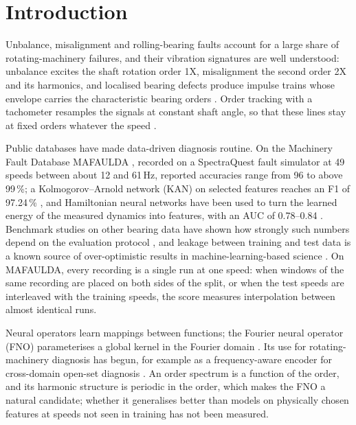 \documentclass[preprint,review,12pt,authoryear=false]{elsarticle}
\begin{document}
\section{Introduction}
\label{sec:intro}

Unbalance, misalignment and rolling-bearing faults account for a large share of rotating-machinery failures, and
their vibration signatures are well understood: unbalance excites the shaft rotation order 1X, misalignment the
second order 2X and its harmonics, and localised bearing defects produce impulse trains whose envelope carries the
characteristic bearing orders \citep{randall2011bearing}. Order tracking with a tachometer resamples the signals at
constant shaft angle, so that these lines stay at fixed orders whatever the speed \citep{fyfe1997cot}.

Public databases have made data-driven diagnosis routine. On the Machinery Fault Database MAFAULDA \citep{mafaulda},
recorded on a SpectraQuest fault simulator at 49 speeds between about 12 and 61\,Hz, reported accuracies range from
96 to above 99\,\%; a Kolmogorov--Arnold network (KAN) on selected features reaches an F1 of 97.24\,\%
\citep{rigas2024kan}, and Hamiltonian neural networks have been used to turn the learned energy of the measured
dynamics into features, with an AUC of 0.78--0.84 \citep{shen2023hnn}. Benchmark studies on other bearing data
have shown how strongly such numbers depend on the evaluation protocol \citep{smith2015cwru,zhao2020benchmark}, and
leakage between training and test data is a known source of over-optimistic results in machine-learning-based
science \citep{kapoor2023leakage}. On MAFAULDA, every recording is a single run at one speed: when windows of the same
recording are placed on both sides of the split, or when the test speeds are interleaved with the training speeds,
the score measures interpolation between almost identical runs.

Neural operators learn mappings between functions; the Fourier neural operator (FNO) parameterises a global kernel in
the Fourier domain \citep{li2021fno}. Its use for rotating-machinery diagnosis has begun, for example as a
frequency-aware encoder for cross-domain open-set diagnosis \citep{gao2025frequency}. An order spectrum is a function
of the order, and its harmonic structure is periodic in the order, which makes the FNO a natural candidate; whether it
generalises better than models on physically chosen features at speeds not seen in training has not been measured.
\end{document}
